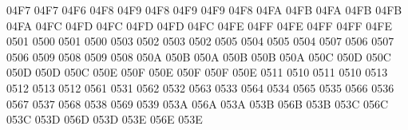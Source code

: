 \setcclcuc 04F7 04F7 04F6 %
\setcclcuc 04F8 04F9 04F8 %
\setcclcuc 04F9 04F9 04F8 %
\setcclcuc 04FA 04FB 04FA %
\setcclcuc 04FB 04FB 04FA %
\setcclcuc 04FC 04FD 04FC %
\setcclcuc 04FD 04FD 04FC %
\setcclcuc 04FE 04FF 04FE %
\setcclcuc 04FF 04FF 04FE %
 0501 0500 %
 0501 0500 %
 0503 0502 %
 0503 0502 %
 0505 0504 %
 0505 0504 %
 0507 0506 %
 0507 0506 %
 0509 0508 %
 0509 0508 %
\setcclcuc 050A 050B 050A %
\setcclcuc 050B 050B 050A %
\setcclcuc 050C 050D 050C %
\setcclcuc 050D 050D 050C %
\setcclcuc 050E 050F 050E %
\setcclcuc 050F 050F 050E %
 0511 0510 %
 0511 0510 %
 0513 0512 %
 0513 0512 %
 0561 0531 %
 0562 0532 %
 0563 0533 %
 0564 0534 %
 0565 0535 %
 0566 0536 %
 0567 0537 %
 0568 0538 %
 0569 0539 %
\setcclcuc 053A 056A 053A %
\setcclcuc 053B 056B 053B %
\setcclcuc 053C 056C 053C %
\setcclcuc 053D 056D 053D %
\setcclcuc 053E 056E 053E %
